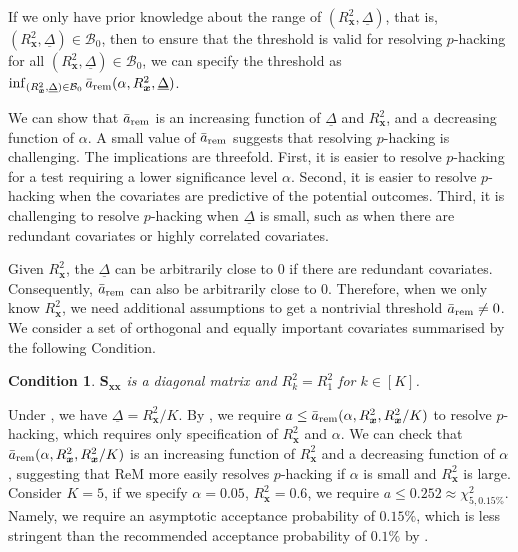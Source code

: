 \documentclass[12pt]{article}
\newtheorem{condition}{Condition}
\newcommand{\rem}{\textnormal{rem}}
\newcommand{\bs}{\boldsymbol}
\begin{document}
If we only have prior knowledge about the range of $(R^2_{\bs{x}}, \underline{\Delta})$, that is, $(R^2_{\bs{x}}, \underline{\Delta}) \in \mathcal{B}_0$, then to ensure that the threshold is valid for resolving $p$-hacking for all $(R^2_{\bs{x}}, \underline{\Delta}) \in \mathcal{B}_0$, we can specify the threshold as $\inf_{(R^2_{\bs{x}}, \underline{\Delta}) \in \mathcal{B}_0} \bar{a}_{\rem}(\alpha,R^2_{\bs{x}}, \underline{\Delta})$.
 
We can show that $\bar{a}_{\rem}$ is an increasing function of $\underline{\Delta}$ and $R^2_{\bs{x}}$, and a decreasing function of $\alpha$. A small value of $\bar{a}_{\rem}$ suggests that resolving $p$-hacking is challenging. The implications are threefold. First, it is easier to resolve $p$-hacking for a test requiring a lower significance level $\alpha$. Second, it is easier to resolve $p$-hacking when the covariates are predictive of the potential outcomes. Third, it is challenging to resolve $p$-hacking when $\underline{\Delta}$ is small, such as when there are redundant covariates or highly correlated covariates. 

 
Given $R^2_{\bs{x}}$, the $\underline{\Delta}$ can be arbitrarily close to $0$ if there are redundant covariates. 
Consequently, $\bar{a}_{\rem}$ can also be arbitrarily close to $0$. Therefore, when we only know $R^2_{\bs{x}}$, we need additional assumptions to get a nontrivial threshold $\bar{a}_{\rem}\ne 0$.  We consider a set of orthogonal and equally important covariates summarised by the following Condition.
 \begin{condition}
 \label{a:orthogonal-covariates-equally-importance}
     $\bs{S}_{\bs{x}\bs{x}}$ is a diagonal matrix and $R^2_{k} = R^2_1$ for $k\in [K]$.
 \end{condition}

Under , we have  $\underline{\Delta} = R^2_{\bs{x}}/K$. By , we require $a\leq \bar{a}_\rem(\alpha,R^2_{\bs{x}},R^2_{\bs{x}}/K)$ to resolve $p$-hacking, which requires only specification of $R^2_{\bs{x}}$ and $\alpha$. We can check that $\bar{a}_\rem(\alpha,R^2_{\bs{x}},R^2_{\bs{x}}/K)$ is an increasing function of $R^2_{\bs{x}}$ and a decreasing function of $\alpha$, suggesting that ReM more easily resolves  $p$-hacking if $\alpha$ is small and $R_{\bs{x}}^2$ is large. Consider $K=5$, if we specify $\alpha=0.05$, $R^2_{\bs{x}} = 0.6$, we require $a \leq 0.252 \approx \chi_{5,0.15\%}^2$. Namely, we require an asymptotic acceptance probability of $0.15\%$, which is less stringent than the recommended acceptance probability of $0.1\%$ by \citet{Li9157}.
\end{document}
